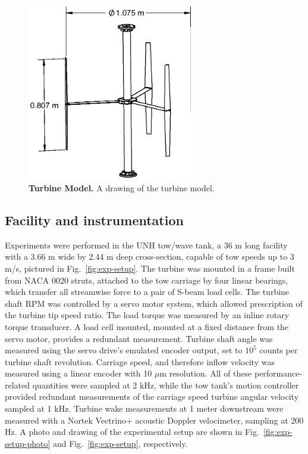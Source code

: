\documentclass[10pt,letterpaper]{article}
\begin{document}
\begin{figure}[h]
    \includegraphics[width=0.65\textwidth]{figures/turbine.eps}

    \caption{{\bf Turbine Model.} A drawing of the turbine model.}

    \label{fig:turbine-drawing}
\end{figure}


\subsection*{Facility and instrumentation}

Experiments were performed in the UNH tow/wave tank, a 36 m long facility with a
3.66 m wide by 2.44 m deep cross-section, capable of tow speeds up to 3 m/s,
pictured in Fig.~\ref{fig:exp-setup}. The turbine was mounted in a frame built
from NACA 0020 struts, attached to the tow carriage by four linear bearings,
which transfer all streamwise force to a pair of S-beam load cells. The turbine
shaft RPM was controlled by a servo motor system, which allowed prescription of
the turbine tip speed ratio. The load torque was measured by an inline rotary
torque transducer. A load cell mounted, mounted at a fixed distance from the
servo motor, provides a redundant measurement. Turbine shaft angle was measured
using the servo drive's emulated encoder output, set to $10^5$ counts per
turbine shaft revolution. Carriage speed, and therefore inflow velocity was
measured using a linear encoder with 10 $\mu$m resolution. All of these
performance-related quantities were sampled at 2 kHz, while the tow tank's
motion controller provided redundant measurements of the carriage speed turbine
angular velocity sampled at 1 kHz. Turbine wake measurements at 1 meter
downstream were measured with a Nortek Vectrino+ acoustic Doppler velocimeter,
sampling at 200 Hz. A photo and drawing of the experimental setup are shown in
Fig.~\ref{fig:exp-setup-photo} and Fig.~\ref{fig:exp-setup}, respectively.
\end{document}
